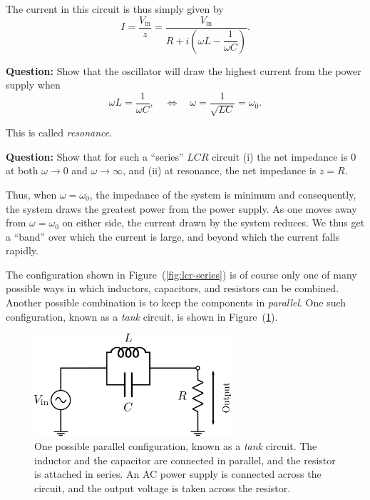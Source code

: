 The current in this circuit is thus simply given by 
\begin{equation}
    I = \frac{V_\text{in}}{z} = \frac{V_\text{in}}{R + i  \left( \omega L - \dfrac{1}{\omega C} \right) }.
\end{equation}

\begin{question}
    \textbf{Question:} Show that the oscillator will draw the highest current from the power supply when 
    \begin{equation}
        \omega L = \frac{1}{\omega C}, \quad \iff \quad \omega = \frac{1}{\sqrt{LC}} = \omega_0. 
    \end{equation}

    This is called \textsl{resonance}.

    \textbf{Question:} Show that for such a ``series'' $LCR$ circuit (i) the net impedance is $0$ at both $\omega \to 0$ and $\omega\to\infty$, and (ii) at resonance, the net impedance is $z=R$.
\end{question}

Thus, when $\omega = \omega_0$, the impedance of the system is minimum and consequently, the system draws the greatest power from the power supply. As one moves away from $\omega=\omega_0$ on either side, the current drawn by the system reduces. We thus get a ``band'' over which the current is large, and beyond which the current falls rapidly. 



The configuration shown in Figure~(\ref{fig:lcr-series}) is of course only one of many possible ways in which inductors, capacitors, and resistors can be combined. Another possible combination is to keep the components in \textsl{parallel}. One such configuration, known as a \textsl{tank} circuit, is shown in Figure~(\ref{fig:lcr-parallel}). 

\begin{figure}[!htb]
    \centering
    \includegraphics[width=0.65\textwidth]{figs/electronics-circuits/LCRParallel.png}
    \caption{One possible parallel configuration, known as a \textsl{tank} circuit. The inductor and the capacitor are connected in parallel, and the resistor is attached in series. An AC power supply is connected across the circuit, and the output voltage is taken across the resistor. }
    \label{fig:lcr-parallel}
\end{figure}

